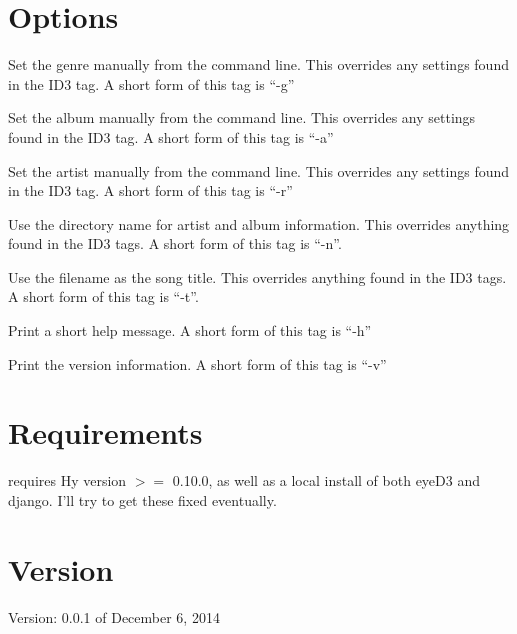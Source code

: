 \documentclass[english]{article}
\begin{document}
\section{Options}
\begin{Description}
\item[\OptArg{--genre}{genre}] Set the genre manually from the command
  line.  This overrides any settings found in the ID3 tag.  A short form
  of this tag is ``-g''

\item[\OptArg{--album}{album}] Set the album manually from the command
  line.  This overrides any settings found in the ID3 tag.  A short form
  of this tag is ``-a''

\item[\OptArg{--artist}{artist}] Set the artist manually from the command
  line.  This overrides any settings found in the ID3 tag.  A short form
  of this tag is ``-r''

\item[\Opt{--usedir}] Use the directory name for artist and album
  information.  This overrides anything found in the ID3 tags.  A short
  form of this tag is ``-n''.

\item[\Opt{--usefilename}] Use the filename as the song title.  This
  overrides anything found in the ID3 tags.  A short form of this tag is
  ``-t''.

\item[\Opt{--help}] Print a short help message.  A short form of this
  tag is ``-h''

\item[\Opt{--version}] Print the version information.  A short form of this
  tag is ``-v''

\section{Requirements}

\begin{description}\setlength{\itemsep}{1cm}
\item[Hy]  requires Hy version $>=$ 0.10.0, as well as
  a local install of both eyeD3 and django.  I'll try to get these
  fixed eventually.

\end{description}

\section{Version}
Version: 0.0.1 of December 6, 2014


\end{Description}
\end{document}
